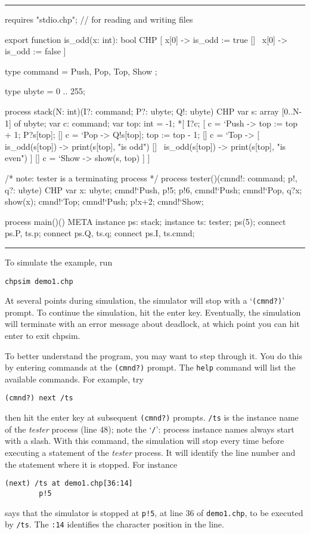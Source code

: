 \medskip
\hrule
\begin{listing}{1}
requires "stdio.chp"; // for reading and writing files

export function is_odd(x: int): bool
CHP
  { [   x[0] -> is_odd := true
    [] ~x[0] -> is_odd := false
    ]
  }

type command = { Push, Pop, Top, Show };

type ubyte = {0 .. 255};

process stack(N: int)(I?: command; P?: ubyte; Q!: ubyte)
CHP
  { var s: array [0..N-1] of ubyte;
    var c: command;
    var top: int = -1;
    *[ I?c;
       [ c = `Push -> top := top + 1;
                      P?s[top];
      [] c = `Pop  -> Q!s[top];
                      top := top - 1;
      [] c = `Top  -> [  is_odd(s[top]) -> print(s[top], "is odd")
                     [] ~is_odd(s[top]) -> print(s[top], "is even")
                      ]
      [] c = `Show -> show(s, top)
       ]
     ]
  }

/* note: tester is a terminating process */
process tester()(cmnd!: command; p!, q?: ubyte)
CHP
 { var x: ubyte;
   cmnd!`Push, p!5;
   p!6, cmnd!`Push;
   cmnd!`Pop, q?x;
   show(x);
   cmnd!`Top;
   cmnd!`Push; p!x+2;
   cmnd!`Show;
 }

process main()()
META
 { instance ps: stack;
   instance ts: tester;
   ps(5);
   connect ps.P, ts.p;
   connect ps.Q, ts.q;
   connect ps.I, ts.cmnd;
 }
\end{listing}
\hrule
\medskip

To simulate the example, run
\begin{verbatim}
chpsim demo1.chp
\end{verbatim}
At several points during simulation, the simulator will stop with
a `{\tt{}(cmnd?)}' prompt. To continue the simulation, hit the enter key.
Eventually, the simulation will terminate with an error message about
deadlock, at which point you can hit enter to exit chpsim.

To better understand the program, you may want to step through it.
You do this by entering commands at the {\tt{}(cmnd?)} prompt. The {\tt{}help}
command will list the available commands. For example, try
\begin{verbatim}
(cmnd?) next /ts
\end{verbatim}
then hit the enter key at subsequent {\tt{}(cmnd?)} prompts.
{\tt{}/ts} is the instance name of the {\it{}tester} process (line 48); note the
`{\tt{}/}': process instance names always start with a slash. With this command,
the simulation will stop every time before executing a statement of
the {\it{}tester} process. It will identify the line number and the statement
where it is stopped. For instance
\begin{verbatim}
(next) /ts at demo1.chp[36:14]
        p!5
\end{verbatim}
says that the simulator is stopped at {\tt{}p!5}, at line
36 of {\tt{}demo1.chp}, to be executed by {\tt{}/ts}.
The {\tt{}:14} identifies the character position in the line.

